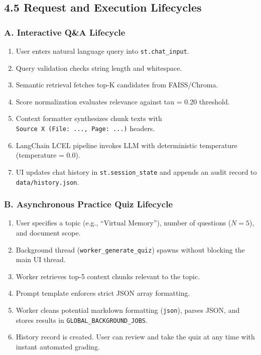 \documentclass[
]{article}
\providecommand{\tightlist}{%
  \setlength{\itemsep}{0pt}\setlength{\parskip}{0pt}}
\begin{document}
\subsection{4.5 Request and Execution
Lifecycles}\label{request-and-execution-lifecycles}

\subsubsection{A. Interactive Q\&A
Lifecycle}\label{a.-interactive-qa-lifecycle}

\begin{enumerate}
\def\labelenumi{\arabic{enumi}.}
\tightlist
\item
  User enters natural language query into \texttt{st.\allowbreak chat\_\allowbreak input}.
\item
  Query validation checks string length and whitespace.
\item
  Semantic retrieval fetches top-K candidates from FAISS/Chroma.
\item
  Score normalization evaluates relevance against tau = 0.20 threshold.
\item
  Context formatter synthesizes chunk texts with
  \texttt{Source\ \allowbreak X\ \allowbreak (\allowbreak File:\ \allowbreak .\allowbreak .\allowbreak .,\allowbreak \ \allowbreak Page:\ \allowbreak .\allowbreak .\allowbreak .)\allowbreak } headers.
\item
  LangChain LCEL pipeline invokes LLM with deterministic temperature
  (temperature = 0.0).
\item
  UI updates chat history in \texttt{st.\allowbreak session\_\allowbreak state} and appends an
  audit record to \texttt{data/\allowbreak history.\allowbreak json}.
\end{enumerate}

\subsubsection{B. Asynchronous Practice Quiz
Lifecycle}\label{b.-asynchronous-practice-quiz-lifecycle}

\begin{enumerate}
\def\labelenumi{\arabic{enumi}.}
\tightlist
\item
  User specifies a topic (e.g., ``Virtual Memory''), number of questions
  (\(N=5\)), and document scope.
\item
  Background thread (\texttt{worker\_\allowbreak generate\_\allowbreak quiz}) spawns without
  blocking the main UI thread.
\item
  Worker retrieves top-5 context chunks relevant to the topic.
\item
  Prompt template enforces strict JSON array formatting.
\item
  Worker cleans potential markdown formatting
  (\texttt{\textasciigrave{}\textasciigrave{}\textasciigrave{}json}),
  parses JSON, and stores results in \texttt{GLOBAL\_\allowbreak BACKGROUND\_\allowbreak JOBS}.
\item
  History record is created. User can review and take the quiz at any
  time with instant automated grading.
\end{enumerate}
\end{document}
